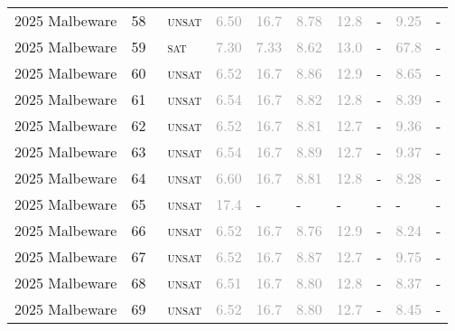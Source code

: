 \begin{center}
{\begin{longtable}{@{}llllllllll@{}}
2025 Malbeware & 58 & ~\textsc{unsat} & \textcolor{darkgray}{6.50} & \textcolor{darkgray}{16.7} & \textcolor{darkgray}{8.78} & \textcolor{darkgray}{12.8} & - & \textcolor{darkgray}{9.25} & - \\
2025 Malbeware & 59 & ~\textsc{sat} & \textcolor{darkgray}{7.30} & \textcolor{darkgray}{7.33} & \textcolor{darkgray}{8.62} & \textcolor{darkgray}{13.0} & - & \textcolor{darkgray}{67.8} & - \\
2025 Malbeware & 60 & ~\textsc{unsat} & \textcolor{darkgray}{6.52} & \textcolor{darkgray}{16.7} & \textcolor{darkgray}{8.86} & \textcolor{darkgray}{12.9} & - & \textcolor{darkgray}{8.65} & - \\
2025 Malbeware & 61 & ~\textsc{unsat} & \textcolor{darkgray}{6.54} & \textcolor{darkgray}{16.7} & \textcolor{darkgray}{8.82} & \textcolor{darkgray}{12.8} & - & \textcolor{darkgray}{8.39} & - \\
2025 Malbeware & 62 & ~\textsc{unsat} & \textcolor{darkgray}{6.52} & \textcolor{darkgray}{16.7} & \textcolor{darkgray}{8.81} & \textcolor{darkgray}{12.7} & - & \textcolor{darkgray}{9.36} & - \\
2025 Malbeware & 63 & ~\textsc{unsat} & \textcolor{darkgray}{6.54} & \textcolor{darkgray}{16.7} & \textcolor{darkgray}{8.89} & \textcolor{darkgray}{12.7} & - & \textcolor{darkgray}{9.37} & - \\
2025 Malbeware & 64 & ~\textsc{unsat} & \textcolor{darkgray}{6.60} & \textcolor{darkgray}{16.7} & \textcolor{darkgray}{8.81} & \textcolor{darkgray}{12.8} & - & \textcolor{darkgray}{8.28} & - \\
2025 Malbeware & 65 & ~\textsc{unsat} & \textcolor{darkgray}{17.4} & - & - & - & - & - & - \\
2025 Malbeware & 66 & ~\textsc{unsat} & \textcolor{darkgray}{6.52} & \textcolor{darkgray}{16.7} & \textcolor{darkgray}{8.76} & \textcolor{darkgray}{12.9} & - & \textcolor{darkgray}{8.24} & - \\
2025 Malbeware & 67 & ~\textsc{unsat} & \textcolor{darkgray}{6.52} & \textcolor{darkgray}{16.7} & \textcolor{darkgray}{8.87} & \textcolor{darkgray}{12.7} & - & \textcolor{darkgray}{9.75} & - \\
2025 Malbeware & 68 & ~\textsc{unsat} & \textcolor{darkgray}{6.51} & \textcolor{darkgray}{16.7} & \textcolor{darkgray}{8.80} & \textcolor{darkgray}{12.8} & - & \textcolor{darkgray}{8.37} & - \\
2025 Malbeware & 69 & ~\textsc{unsat} & \textcolor{darkgray}{6.52} & \textcolor{darkgray}{16.7} & \textcolor{darkgray}{8.80} & \textcolor{darkgray}{12.7} & - & \textcolor{darkgray}{8.45} & - \\

\end{longtable}}
\end{center}

